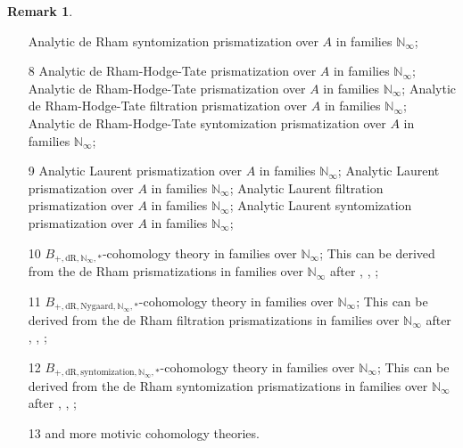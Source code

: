 \documentclass[12pt]{article}
\theoremstyle{definition}
\newtheorem{remark}{Remark}
\begin{document}
\begin{remark}
\begin{itemize}
\subitem[7III] Analytic de Rham syntomization prismatization over $A$ in families $\mathbb{N}_\infty$;
\item[8] Analytic de Rham-Hodge-Tate prismatization over $A$ in families $\mathbb{N}_\infty$;
\subitem[8I] Analytic de Rham-Hodge-Tate prismatization over $A$ in families $\mathbb{N}_\infty$;
\subitem[8II] Analytic de Rham-Hodge-Tate filtration prismatization over $A$ in families $\mathbb{N}_\infty$;
\subitem[8III] Analytic de Rham-Hodge-Tate syntomization prismatization over $A$ in families $\mathbb{N}_\infty$;
\item[9] Analytic Laurent prismatization over $A$ in families $\mathbb{N}_\infty$;
\subitem[9I] Analytic Laurent prismatization over $A$ in families $\mathbb{N}_\infty$;
\subitem[9II] Analytic Laurent filtration prismatization over $A$ in families $\mathbb{N}_\infty$;
\subitem[9III] Analytic Laurent syntomization prismatization over $A$ in families $\mathbb{N}_\infty$;
\item[10] $B_{+,\mathrm{dR},\mathbb{N}_\infty,*}$-cohomology theory in families over $\mathbb{N}_\infty$;
\subitem[$\blacksquare$] This can be derived from the de Rham prismatizations in families over $\mathbb{N}_\infty$ after \cite{3Ta}, \cite{3F}, \cite{3S3};
\item[11] $B_{+,\mathrm{dR},\mathrm{Nygaard},\mathbb{N}_\infty,*}$-cohomology theory in families over $\mathbb{N}_\infty$;
\subitem[$\blacksquare$] This can be derived from the de Rham filtration prismatizations in families over $\mathbb{N}_\infty$ after \cite{3Ta}, \cite{3F}, \cite{3S3};
\item[12] $B_{+,\mathrm{dR},\mathrm{syntomization},\mathbb{N}_\infty,*}$-cohomology theory in families over $\mathbb{N}_\infty$;
\subitem[$\blacksquare$] This can be derived from the de Rham syntomization  prismatizations in families over $\mathbb{N}_\infty$ after \cite{3Ta}, \cite{3F}, \cite{3S3};
\item[13] and more motivic cohomology theories.
\end{itemize}
\end{remark}
\end{document}
